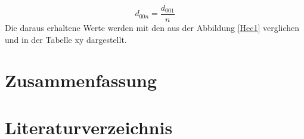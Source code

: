 \documentclass[12pt, a4paper]{article}
\begin{document}
\begin{equation}
  d_{00n}=\frac{d_{001}}{n}
  \label{d00n}
\end{equation}
\noindent
Die daraus erhaltene Werte werden mit den aus der Abbildung \ref{Hec1} verglichen und in der Tabelle xy dargestellt.






\newpage
\section{Zusammenfassung}
\cite{Skript}



\newpage
\section{Literaturverzeichnis}
\printbibliography
\end{document}
